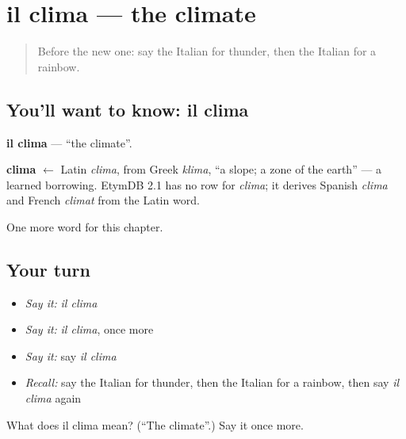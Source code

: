 \section[il clima]{il clima — the climate}

\label{lesson:IT-C256-clima}



\begin{quote}
Before the new one: say the Italian for thunder, then the Italian for a rainbow.
\end{quote}

\subsection*{You'll want to know: il clima}
\textbf{il clima} — \textquotedblleft{}the climate\textquotedblright{}.

\begin{cousinweb}
\textbf{clima} $\leftarrow$ Latin \emph{clima}, from Greek \emph{klima}, \textquotedblleft{}a slope; a zone of the earth\textquotedblright{} — a learned borrowing. EtymDB 2.1 has no row for \emph{clima}; it derives Spanish \emph{clima} and French \emph{climat} from the Latin word.
\end{cousinweb}

\begin{grammarlens}[title={What you've built}]
One more word for this chapter.
\end{grammarlens}

\subsection*{Your turn}
\begin{itemize}
\raggedright
  \item \emph{Say it:} \emph{il clima}
  \item \emph{Say it:} \emph{il clima}, once more
  \item \emph{Say it:} say \emph{il clima}
  \item \emph{Recall:} say the Italian for thunder, then the Italian for a rainbow, then say \emph{il clima} again
\end{itemize}

\begin{tcolorbox}[breakable,colback=teal!4,colframe=teal!35!black,title={Before you move on}]
What does il clima mean? (\textquotedblleft{}The climate\textquotedblright{}.) Say it once more.
\end{tcolorbox}
